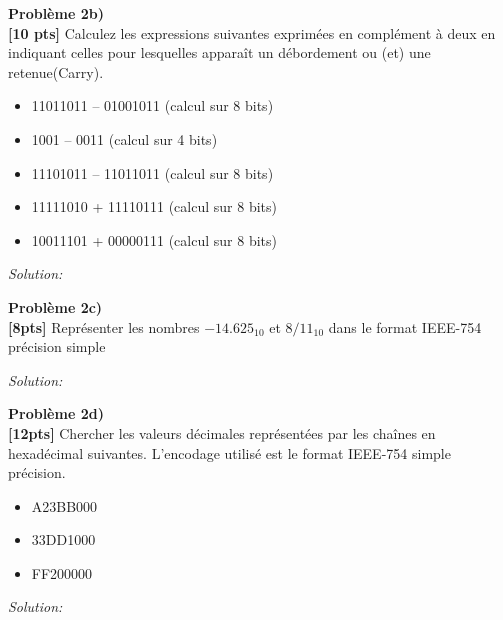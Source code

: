 \documentclass{article}
\newenvironment{problem}[2][Problème]
    { \begin{mdframed}[backgroundcolor=gray!20] \textbf{#1 #2} \\}
    {  \end{mdframed}}
\newenvironment{solution}
    {\textit{Solution:}}
    {}
\begin{document}
\newpage
\begin{problem}{2b)}
\textbf{[10 pts]} Calculez les expressions suivantes exprimées en complément à deux en indiquant
celles pour lesquelles apparaît un débordement ou (et) une retenue(Carry).
\begin{itemize}
        \item 11011011 – 01001011 (calcul sur 8 bits)
        \item 1001 – 0011 (calcul sur 4 bits)
        \item 11101011 – 11011011 (calcul sur 8 bits)
        \item 11111010 + 11110111 (calcul sur 8 bits)
        \item 10011101 + 00000111 (calcul sur 8 bits)
    \end{itemize}
\end{problem}
\begin{solution}
    








\end{solution}

\begin{problem}{2c)}
\textbf{[8pts]} Représenter les nombres $-14.625_{10}$ et $8/11_{10}$ dans le format IEEE-754 précision simple
\end{problem}

\begin{solution}
\end{solution}


\begin{problem}{2d)}
\textbf{[12pts]} Chercher les valeurs décimales représentées par les chaînes en hexadécimal
suivantes. L’encodage utilisé est le format IEEE-754 simple précision.
\begin{itemize}
    \item A23BB000
    \item 33DD1000
    \item FF200000
\end{itemize}
\end{problem}

\begin{solution}
\end{solution}
\end{document}
